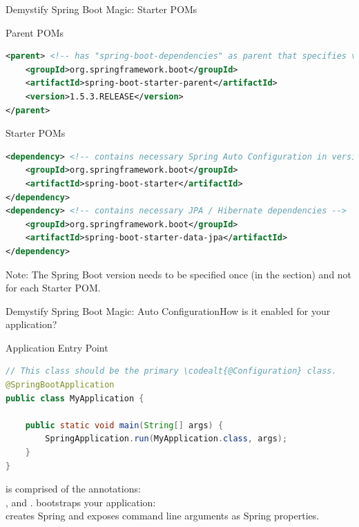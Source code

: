 \begin{frame}[t,fragile]{Demystify Spring Boot Magic: Starter POMs}
\footnotesize
\begin{block}{Parent POMs}
\begin{lstlisting}[language=xml,belowskip=-3mm,aboveskip=0mm]
<parent> <!-- has "spring-boot-dependencies" as parent that specifies versions -->
    <groupId>org.springframework.boot</groupId>
    <artifactId>spring-boot-starter-parent</artifactId>
    <version>1.5.3.RELEASE</version> 
</parent>
\end{lstlisting}
\end{block}
\begin{block}{Starter POMs}
\begin{lstlisting}[language=xml,belowskip=-3mm,aboveskip=0mm]
<dependency> <!-- contains necessary Spring Auto Configuration in version 1.5.3 -->
    <groupId>org.springframework.boot</groupId>
    <artifactId>spring-boot-starter</artifactId>
</dependency>
<dependency> <!-- contains necessary JPA / Hibernate dependencies -->
    <groupId>org.springframework.boot</groupId>
    <artifactId>spring-boot-starter-data-jpa</artifactId>
</dependency>
\end{lstlisting}
\end{block}
Note: The Spring Boot version needs to be specified once (in the  section) and not for each Starter POM.
\end{frame}



\begin{frame}[t,fragile]{Demystify Spring Boot Magic: Auto Configuration}{How is it enabled for your application?}
\begin{block}{Application Entry Point}
\begin{lstlisting}[language=java,belowskip=-3mm,aboveskip=0mm]
// This class should be the primary \codealt{@Configuration} class. 
@SpringBootApplication
public class MyApplication {

    public static void main(String[] args) {
        SpringApplication.run(MyApplication.class, args);
    }
}
\end{lstlisting}
\end{block}
\vfill
\small
\textbf{} is comprised of the annotations: \\,  and \textbf{}. 
\vfill
\textbf{} bootstraps your application: \\creates Spring  and exposes command line arguments as Spring properties.
\end{frame}
    
